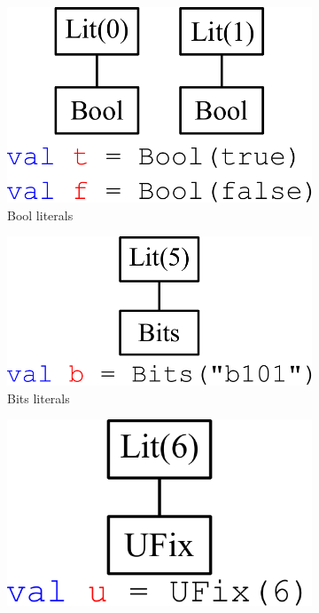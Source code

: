 \begin{figure}[b]
\centering
  \begin{subfigure}[t]{0.22\textwidth}
  \centering
  \includegraphics[width=\textwidth]{figures/bool.pdf}
  \caption{Bool literals}
  \label{fig:bool}
  \end{subfigure}
  \hfill
  \begin{subfigure}[t]{0.22\textwidth}
  \centering
  \includegraphics[width=\textwidth]{figures/bits.pdf}
  \caption{Bits literals}
  \label{fig:bits}
  \end{subfigure}
  \hfill
  \begin{subfigure}[t]{0.22\textwidth}
  \centering
  \includegraphics[width=\textwidth]{figures/ufix.pdf}

\end{subfigure}
\end{figure}
